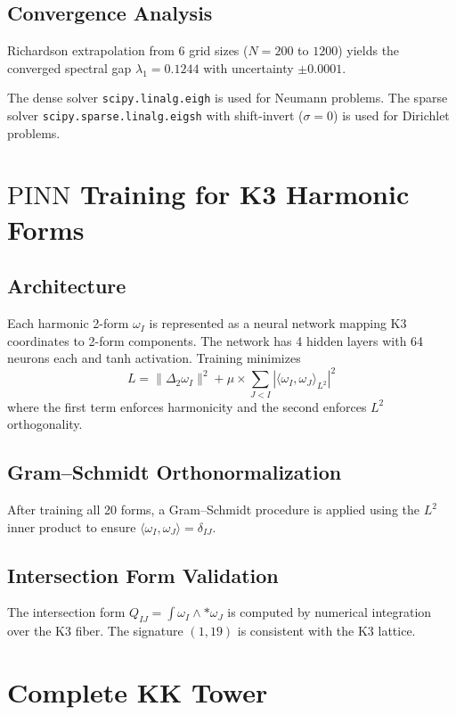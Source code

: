 \documentclass[11pt,a4paper]{article}
\newcommand{\PINN}{\mathrm{PINN}}
\theoremstyle{remark}
\begin{document}
\subsection{Convergence Analysis}

Richardson extrapolation from 6 grid sizes ($N = 200$ to $1200$) yields the converged
spectral gap $\lambda_1 = 0.1244$ with uncertainty $\pm 0.0001$.

The dense solver \texttt{scipy.linalg.eigh} is used for Neumann problems. The sparse solver
\texttt{scipy.sparse.\allowbreak linalg.eigsh} with shift-invert ($\sigma = 0$) is used for Dirichlet
problems.

\section{$\PINN$ Training for K3 Harmonic Forms}

\subsection{Architecture}

Each harmonic 2-form $\omega_I$ is represented as a neural network mapping K3 coordinates
to 2-form components. The network has 4 hidden layers with 64 neurons each and
tanh activation. Training minimizes
\begin{equation}
L = \|\Delta_2 \omega_I\|^2 + \mu \times \sum_{J<I} |\langle\omega_I, \omega_J\rangle_{L^2}|^2
\end{equation}
where the first term enforces harmonicity and the second enforces $L^2$ orthogonality.

\subsection{Gram--Schmidt Orthonormalization}

After training all 20 forms, a Gram--Schmidt procedure is applied using the $L^2$
inner product to ensure $\langle\omega_I, \omega_J\rangle = \delta_{IJ}$.

\subsection{Intersection Form Validation}

The intersection form $Q_{IJ} = \int \omega_I \wedge {*}\omega_J$ is computed by numerical integration
over the K3 fiber. The signature $(1, 19)$ is consistent with the K3 lattice.

\section{Complete KK Tower}
\end{document}
